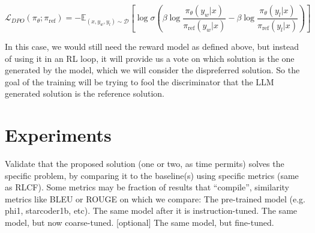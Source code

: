\documentclass{article}
\begin{document}
\[
\mathcal{L}_{DPO}(\pi_\theta; \pi_{\text{ref}}) = -\mathbb{E}_{(x, y_w, y_l) \sim \mathcal{D}} [\log\sigma (\beta \log \frac{\pi_\theta(y_w | x)}{\pi_{\text{ref}}(y_w | x)} - \beta \log \frac{\pi_\theta(y_l | x)}{\pi_{\text{ref}}(y_l | x)})]
\]

In this case, we would still need the reward model as defined above, but instead of using it in an RL loop, it will provide us a vote on which solution is the one generated by the model, which we will consider the dispreferred solution. So the goal of the training will be trying to fool the discriminator that the LLM generated solution is the reference solution.

\section*{Experiments}
Validate that the proposed solution (one or two, as time permits) solves the specific problem, by comparing it to the baseline(s) using specific metrics (same as RLCF). Some metrics may be fraction of results that “compile”, similarity metrics like BLEU or ROUGE on which we compare:
The pre-trained model (e.g. phi1, starcoder1b, etc).
The same model after it is instruction-tuned.
The same model, but now coarse-tuned.
[optional] The same model, but fine-tuned.
\end{document}
